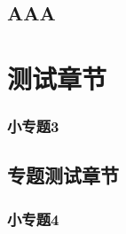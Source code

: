 \documentclass[color=yellow,openany]{textbook-cn}%
\begin{document}
\zhlipsum\zhlipsum

\chapter*{AAA}

\zhlipsum\zhlipsum

\part[宝贝]{测试章节}


\lipsum

\begin{Definition}
\lipsum[2]
\end{Definition}





\begin{Topic}

\section{小专题3}
\chapter{专题测试章节}
\section{小专题4}

\end{Topic}













\end{document}
